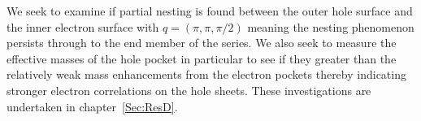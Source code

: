 We seek to examine if partial nesting is found between the outer hole surface and the inner electron surface with $q=(\pi, \pi, \pi/2)$ meaning the nesting phenomenon persists through to the end member of the series. We also seek to measure the effective masses of the hole pocket in particular to see if they greater than the relatively weak mass enhancements from the electron pockets thereby indicating stronger electron correlations on the hole sheets. These investigations are undertaken in chapter~\ref{Sec:ResD}.





